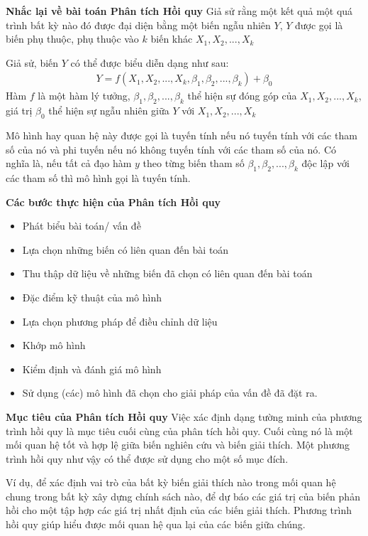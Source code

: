 \documentclass{article}
\begin{document}
	\textbf{Nhắc lại về bài toán Phân tích Hồi quy}
	Giả sử rằng một kết quả một quá trình bất kỳ nào đó được đại diện bằng một biến ngẫu nhiên $Y$, $Y$ được gọi là biến phụ thuộc, phụ thuộc vào $k$ biến khác $X_1, X_2, ..., X_k$

	Giả sử, biến $Y$ có thể được biểu diễn dạng như sau:
	\begin{align*}
		Y = f(X_1, X_2, ..., X_k, \beta_1, \beta_2, ..., \beta_k) + \beta_0
	\end{align*}
	Hàm $f$ là một hàm lý tưởng, $\beta_1, \beta_2, ..., \beta_k$ thể hiện sự đóng góp của $X_1, X_2, ..., X_k$, giá trị $\beta_0$ thể hiện sự ngẫu nhiên giữa $Y$ với $X_1, X_2, ..., X_k$
	
	Mô hình hay quan hệ này được gọi là tuyến tính nếu nó tuyến tính với các tham số của nó và phi tuyến nếu nó không tuyến tính với các tham số của nó. Có nghĩa là, nếu tất cả đạo hàm $y$ theo từng biến tham số $\beta_1, \beta_2, ..., \beta_k$ độc lập với các tham số thì mô hình gọi là tuyến tính.
	
	\textbf{Các bước thực hiện của Phân tích Hồi quy}
	\begin{itemize}
		\item Phát biểu bài toán/ vấn đề
		\item Lựa chọn những biến có liên quan đến bài toán
		\item Thu thập dữ liệu về những biến đã chọn có liên quan đến bài toán
		\item Đặc điểm kỹ thuật của mô hình
		\item Lựa chọn phương pháp để điều chỉnh dữ liệu
		\item Khớp mô hình
		\item Kiểm định và đánh giá mô hình
		\item Sử dụng (các) mô hình đã chọn cho giải pháp của vấn đề đã đặt ra.
	\end{itemize}

	\textbf{Mục tiêu của Phân tích Hồi quy} Việc xác định dạng tường minh của phương trình hồi quy là mục tiêu cuối cùng của phân tích hồi quy. Cuối cùng nó là một mối quan hệ tốt và hợp lệ giữa biến nghiên cứu và biến giải thích. Một phương trình hồi quy như vậy có thể được sử dụng cho một số mục đích. 
	
	Ví dụ, để xác định vai trò của bất kỳ biến giải thích nào trong mối quan hệ chung trong bất kỳ xây dựng chính sách nào, để dự báo các giá trị của biến phản hồi cho một tập hợp các giá trị nhất định của các biến giải thích. Phương trình hồi quy giúp hiểu được mối quan hệ qua lại của các biến giữa chúng.
	
\end{document}
